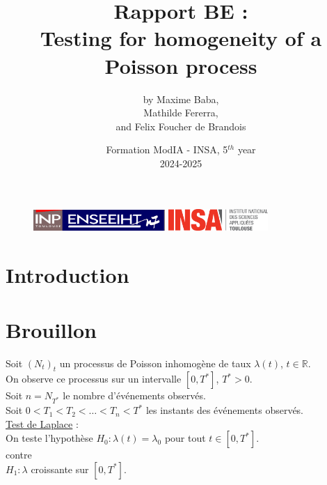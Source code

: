 \documentclass[12pt,a4paper]{article}
\begin{document}
\begin{figure}[t]
    \centering
    \includegraphics[width=5cm]{src/inp_n7.png}
    \hfill
    \includegraphics[width=3.8cm]{src/insa_toulouse.png}
\end{figure}


\title{\vspace{4cm} \textbf{Rapport BE : \\ 
Testing for homogeneity of a Poisson process}}

\author{by Maxime Baba, \\
        Mathilde Fererra, \\
        and Felix Foucher de Brandois}
        
\date{\vfill Formation ModIA - INSA, 5$^{th}$ year \\
2024-2025}

\maketitle

\newpage
\tableofcontents
\listoffigures

\newpage


\section{Introduction}


\section{Brouillon}


Soit $(N_t)_t$ un processus de Poisson inhomogène de taux $\lambda(t)$, $t \in \mathbb{R}$. \\

On observe ce processus sur un intervalle $[0, T^*]$, $T^* > 0$. \\
Soit $n = N_{T^*}$ le nombre d'événements observés. \\
Soit $0 < T_1 < T_2 < \ldots < T_n < T^*$ les instants des événements observés. \\

\underline{Test de Laplace} : \\
On teste l'hypothèse $H_0 : \lambda(t) = \lambda_0$ pour tout $t \in [0, T^*]$. \\
contre \\
$H_1 : \lambda$ croissante sur $[0, T^*]$. \\
\end{document}

